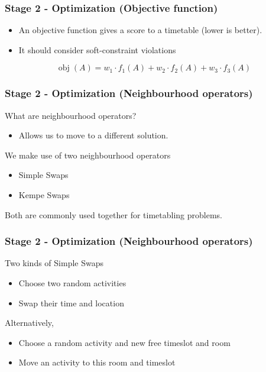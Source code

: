 \documentclass{beamer}
\DeclareMathOperator{\obj}{obj}
\begin{document}
\begin{frame}
	\frametitle{Stage 2 - Optimization (Objective function)}
\begin{block}{}
	\begin{itemize}
		\item An objective function gives a score to a timetable (lower is better).
		
		\item It should consider soft-constraint violations
	\end{itemize}
\end{block}
	\begin{block}{}
	\begin{equation*}
	\obj(A) = w_1\cdot f_1(A) + w_2 \cdot f_2(A) + w_3 \cdot f_3(A)
	\end{equation*}
	\end{block}
\end{frame}

\begin{frame}
	\frametitle{Stage 2 - Optimization (Neighbourhood operators)}
	
	What are neighbourhood operators?
	
	\begin{itemize}
		\item Allows us to move to a different solution.
	\end{itemize}
	
	We make use of two neighbourhood operators
	
	\begin{itemize}
		\item Simple Swaps 
		\item Kempe Swaps
	\end{itemize}

	Both are commonly used together for timetabling problems.
\end{frame}

\begin{frame}
	\frametitle{Stage 2 - Optimization (Neighbourhood operators)}
	
	Two kinds of Simple Swaps
	
	\begin{itemize}
		\item Choose two random activities
		\item Swap their time and location
	\end{itemize}

	Alternatively,
	
	\begin{itemize}
		\item Choose a random activity and new free timeslot and room
		\item Move an activity to this room and timeslot
	\end{itemize}
\end{frame}
\end{document}
